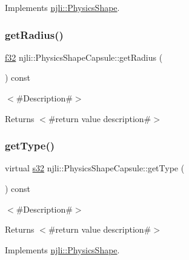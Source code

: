 Implements \mbox{\hyperlink{classnjli_1_1_physics_shape_ad5418af48c1210d6d5119244826cacbb}{njli\+::\+Physics\+Shape}}.

\mbox{\label{classnjli_1_1_physics_shape_capsule_a14ecb677772d4798d4bdcb5c3f971db2}} 
\subsubsection{\texorpdfstring{get\+Radius()}{getRadius()}}
{\footnotesize\ttfamily \mbox{\hyperlink{_util_8h_a5f6906312a689f27d70e9d086649d3fd}{f32}} njli\+::\+Physics\+Shape\+Capsule\+::get\+Radius (\begin{DoxyParamCaption}{ }\end{DoxyParamCaption}) const}

$<$\#\+Description\#$>$

\begin{DoxyReturn}{Returns}
$<$\#return value description\#$>$ 
\end{DoxyReturn}
\mbox{\label{classnjli_1_1_physics_shape_capsule_a7eaa51f833cedddc3f70ee71ce83fc41}} 
\subsubsection{\texorpdfstring{get\+Type()}{getType()}}
{\footnotesize\ttfamily virtual \mbox{\hyperlink{_util_8h_aa62c75d314a0d1f37f79c4b73b2292e2}{s32}} njli\+::\+Physics\+Shape\+Capsule\+::get\+Type (\begin{DoxyParamCaption}{ }\end{DoxyParamCaption}) const\hspace{0.3cm}{\ttfamily [virtual]}}

$<$\#\+Description\#$>$

\begin{DoxyReturn}{Returns}
$<$\#return value description\#$>$ 
\end{DoxyReturn}


Implements \mbox{\hyperlink{classnjli_1_1_physics_shape_ac7c6b2ac373892095f8220d56f8ad6de}{njli\+::\+Physics\+Shape}}.

